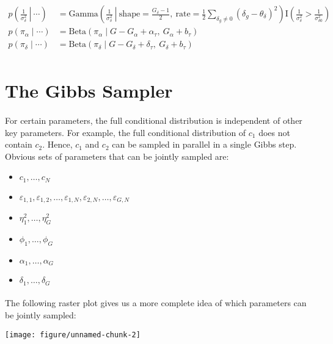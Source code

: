 \documentclass{article}\usepackage{graphicx, color}
\makeatletter
\def\maxwidth{ %
  \ifdim\Gin@nat@width>\linewidth
    \linewidth
  \else
    \Gin@nat@width
  \fi
}
\newenvironment{knitrout}{}{} %
\providecommand{\e}{\varepsilon}
\makeatother
\begin{document}
\begin{flushleft}
\begin{align*}
p \left ( \left . \frac{1}{\sigma_\delta^2}  \ \right \rvert \ \cdots \right ) &= \text{Gamma} \left ( \left . \frac{1}{\sigma_\delta^2} \ \right \rvert \ \text{shape} = \frac{G_\delta - 1}{2}, \ \text{rate} = \frac{1}{2} \sum_{\delta_g \ne 0} (\delta_g - \theta_\delta)^2 \right )  \text{I} \left (\frac{1}{\sigma_\delta^2} >\frac{1}{ \sigma_{\delta 0}^2} \right ) \\
p(\pi_\alpha \mid \cdots) &= \text{Beta}(\pi_\alpha \mid G - G_\alpha + \alpha_\tau, \ G_\alpha + b_\tau) \\
p(\pi_\delta \mid \cdots) &= \text{Beta}(\pi_\delta \mid G - G_\delta + \delta_\tau, \ G_\delta + b_\tau) \\
\end{align*}



\section{The Gibbs Sampler}

\paragraph{} \indent For certain parameters, the full conditional distribution is independent of other key parameters. For example, the full conditional distribution of $c_1$ does not contain $c_2$. Hence, $c_1$ and $c_2$ can be sampled in parallel in a single Gibbs step. Obvious sets of parameters that can be jointly sampled are:

\begin{itemize}
\item $c_1, \ldots, c_N$
\item $\e_{1, 1}, \e_{1, 2}, \ldots, \e_{1, N}, \e_{2, N}, \ldots, \e_{G, N}$
\item $\eta_1^2, \ldots, \eta_G^2$
\item $\phi_1, \ldots, \phi_G$
\item $\alpha_1, \ldots, \alpha_G$
\item $\delta_1, \ldots, \delta_G$
\end{itemize}

\paragraph{} \indent The following raster plot gives us a more complete idea of which parameters can be jointly sampled:

\begin{knitrout}
\color{fgcolor}
\texttt{[image: figure/unnamed-chunk-2]} 


\end{knitrout}
\end{flushleft}
\end{document}
